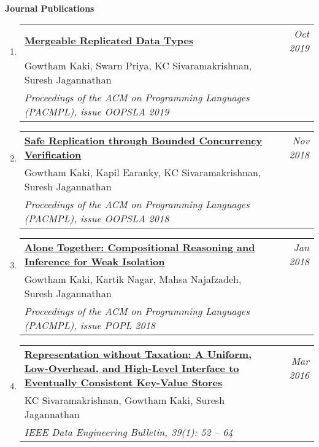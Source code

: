 \documentclass[10pt]{article}
\makeatletter
\newcommand{\lbar}[1]{{\color{#1}\ding{118}}\hspace*{2pt}}
\newenvironment{benumerate}[2]{
    \let\oldItem\item
    \def\item{\addtocounter{enumi}{-2}\oldItem}
    \begin{enumerate}[#2] \itemsep3pt
    \setcounter{enumi}{#1}
    \addtocounter{enumi}{1}}
  {\end{enumerate}}
\newcommand{\service}[1]{\item $\bullet$ \hspace{1ex}\parbox{7.2in}{#1}}
\newenvironment{publication}[5]
{ \item
  \begin{tabular*}{7.5in}{p{6.3in}@{\extracolsep{\fill}}r}
    \href{#1}{\textbf{#2}} & \textit{#3}\\ #4 &\\ \textit{#5}&\\
  \end{tabular*}
} {}
\newenvironment{region}[3]{%
  \vspace*{0.5ex}
  {{\textbf{\large{#1}}}}
  \begin{benumerate}{#3}{\color{RoyalBlue}#2}}
  {\end{benumerate}\vspace{0.8ex}}
\newenvironment{itemregion}[1]{
  \vspace*{0.5ex}
  {{\textbf{\large{#1}}}}
  \begin{itemize}\itemsep1pt}
  {\end{itemize}\vspace{0.8ex}}
\makeatother
\begin{document}

\begin{region} {\lbar{Mahogany}Journal Publications}{{J}1}{4}

	\begin{publication}{http://gowthamk.github.io/docs/mrdt.pdf}
		{Mergeable Replicated Data Types}
    {Oct 2019}{Gowtham Kaki, Swarn Priya, KC Sivaramakrishnan, Suresh Jagannathan}
		{Proceedings of the ACM on Programming Languages (PACMPL), issue OOPSLA 2019}
  \end{publication}

	\begin{publication}{http://gowthamk.github.io/docs/q9.pdf}
		{Safe Replication through Bounded Concurrency Verification}
    {Nov 2018}{Gowtham Kaki, Kapil Earanky, KC Sivaramakrishnan, Suresh Jagannathan}
		{Proceedings of the ACM on Programming Languages (PACMPL), issue OOPSLA 2018}
  \end{publication}

  \begin{publication}{http://gowthamk.github.io/docs/popl18.pdf}
    {Alone Together: Compositional Reasoning and Inference for Weak Isolation}
    {Jan 2018}
    {Gowtham Kaki, Kartik Nagar, Mahsa Najafzadeh, Suresh Jagannathan}
    {Proceedings of the ACM on Programming Languages (PACMPL), issue POPL 2018}
  \end{publication}

  \begin{publication}{http://gowthamk.github.io/docs/quelea_ieee16.pdf}
    {Representation without Taxation: A Uniform, Low-Overhead, and High-Level Interface to Eventually Consistent Key-Value Stores}
    {Mar 2016}{KC Sivaramakrishnan, Gowtham Kaki, Suresh Jagannathan}
    {IEEE Data Engineering Bulletin, 39(1): 52 -- 64}
  \end{publication}
\end{region}
\end{document}
